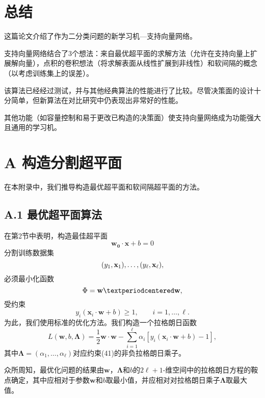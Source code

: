 \documentclass[lang=cn,11pt,a4paper]{elegantpaper}
\begin{document}
	\section{总结}
	这篇论文介绍了作为二分类问题的新学习机—支持向量网络。

	支持向量网络结合了$3$个想法：来自最优超平面的求解方法（允许在支持向量上扩展解向量），点积的卷积想法（将求解表面从线性扩展到非线性）和软间隔的概念（以考虑训练集上的误差）。

	该算法已经经过测试，并与其他经典算法的性能进行了比较。尽管决策面的设计十分简单，但新算法在对比研究中仍表现出非常好的性能。

	其他功能（如容量控制和易于更改已构造的决策面）使支持向量网络成为功能强大且通用的学习机。

	\section*{A 构造分割超平面}
	在本附录中，我们推导构造最优超平面和软间隔超平面的方法。

	\subsection*{A.1 最优超平面算法}
	在第2节中表明，构造最佳超平面
	\begin{equation}
		\mathbf{w_0·x}+b=0\tag{40}
	\end{equation}
	分割训练数据集
	\begin{equation}
		(y_1,\mathbf{x}_1),\ldots,(y_\ell,\mathbf{x}_\ell),\notag
	\end{equation}
	必须最小化函数
	\begin{equation}
		\Phi=\mathbf{w}·\mathbf{w},\notag
	\end{equation}
	受约束
	\begin{equation}
		y_i(\mathbf{x}_i·\mathbf{w}+b)\geq1,\qquad i=1,\ldots,\ell.\tag{41}
	\end{equation}
	为此，我们使用标准的优化方法。我们构造一个拉格朗日函数
	\begin{equation}
		L(\mathbf{w},b,\mathbf{\Lambda})=\frac{1}{2}\mathbf{w}\cdot\mathbf{w}-\sum_{i=1}^\ell\alpha_i[y_i(\mathbf{x}_i\cdot\mathbf{w}+b)-1],\tag{42}
	\end{equation}
	其中$\mathbf{\Lambda}=(\alpha_1,\dots,\alpha_\ell)$对应约束(41)的非负拉格朗日乘子。

	众所周知，最优化问题的结果由$\mathbf{w}$，$\mathbf{\Lambda}$和$b$的$2\ell+1$-维空间中的拉格朗日方程的鞍点确定，其中应相对于参数$\mathbf{w}$和$b$取最小值，并应相对对拉格朗日乘子$\mathbf{\Lambda}$取最大值。
\end{document}
